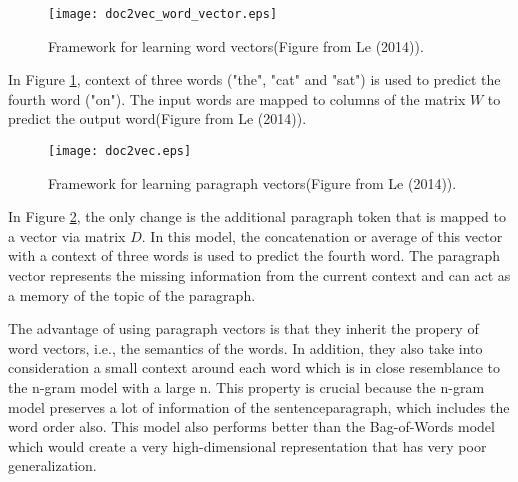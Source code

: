 \begin{figure}[ht!]
\centering
\texttt{[image: doc2vec\_word\_vector.eps]}
\caption{Framework for learning word vectors(Figure from Le (2014)). \label{fig:word2vec}}
\end{figure}
In Figure \ref{fig:word2vec}, context  of three words ("the", "cat" and "sat") is used to predict the fourth word ("on"). The input words are mapped to columns of the matrix $W$ to predict the output word(Figure from Le (2014)).

\begin{figure}[ht!]
\centering
\texttt{[image: doc2vec.eps]}
\caption{Framework for learning paragraph vectors(Figure from Le (2014)). \label{fig:doc2vec}}
\end{figure}
In Figure \ref{fig:doc2vec}, the only change is the additional paragraph token that is mapped to a vector via matrix $D$. In this model, the concatenation or average of this vector with a context of three words is used to predict the fourth word. The paragraph vector represents the missing information from the current context and can act as a memory of the topic of the paragraph.

The advantage of using paragraph vectors is that they inherit the propery of word vectors, i.e., the semantics of the words. In addition, they also take into consideration a small context around each word which is in close resemblance to the n-gram model with a large n. This property is crucial because the n-gram model preserves a lot of information of the sentence\/paragraph, which includes the word order also. This model also performs better than the Bag-of-Words model which would create a very high-dimensional representation that has very poor generalization.
